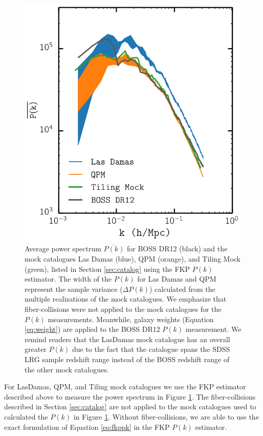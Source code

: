 \documentclass{emulateapj}
\begin{document}
\begin{figure}
\begin{center}
\includegraphics[scale=0.5]{fcpaper_pk_comp.png} 
\caption{Average power spectrum $\overline{P(k)}$ for BOSS DR12 (black) and the mock catalogues Las Damas (blue), QPM (orange), and Tiling Mock (green), listed in Section \ref{sec:catalog} using the FKP $P(k)$ estimator. The width of the $P(k)$ for Las Damas and QPM represent the sample variance ($\Delta P(k)$) calculated from the multiple realizations of the mock catalogues. We emphasize that fiber-collisions were not applied to the mock catalogues for the $P(k)$ measurements. Meanwhile, galaxy weights (Equation \ref{eq:weight}) are applied to the BOSS DR12 $P(k)$ measurement. We remind readers that the LasDamas mock catalogue has an overall greater $\overline{P(k)}$ due to the fact that the catalogue spans the SDSS LRG sample redshift range instead of the BOSS redshift range of the other mock catalogues.} \label{fig:mockpk}
\end{center}
\end{figure}

For LasDamas, QPM, and Tiling mock catalogues we use the FKP estimator described above to measure the power spectrum in Figure \ref{fig:mockpk}. The fiber-collisions described in Section \ref{sec:catalog} are not applied to the mock catalogues used to calculated the $P(k)$ in Figure \ref{fig:mockpk}. Without fiber-collisions, we are able to use the exact formulation of Equation \ref{eq:fkppk} in the FKP $P(k)$ estimator. 
\end{document}
